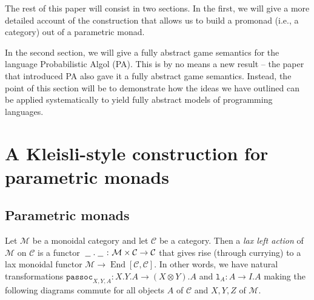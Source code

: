 \documentclass{svproc}
\newcommand\C{\mathcal{C}}
\newcommand\M{\mathcal{M}}
\DeclareMathOperator{\End}{End}
\newcommand{\passoc}{\texttt{passoc}}
\newcommand{\assoc}{\texttt{assoc}}
\newcommand\tensor\otimes
\newcommand\lun{\texttt{l}}
\newcommand\lunit{\texttt{lunit}}
\newcommand\runit{\texttt{runit}}
\newcommand*\from{\colon}
\newcommand{\0}{{\mathtt{0}}} \newcommand{\com}{{\mathtt{com}}}
\newcommand{\blank}{\;\underline{\hspace{1.5ex}}\;}
\begin{document}
The rest of this paper will consist in two sections.  
In the first, we will give a more detailed account of the construction that allows us to build a promonad (i.e., a category) out of a parametric monad.  

In the second section, we will give a fully abstract game semantics for the language Probabilistic Algol (PA).  
This is by no means a new result -- the paper \cite{DanosHarmer} that introduced PA also gave it a fully abstract game semantics.  
Instead, the point of this section will be to demonstrate how the ideas we have outlined can be applied systematically to yield fully abstract models of programming languages.

\section{A Kleisli-style construction for parametric monads}

\subsection{Parametric monads}

Let $\M$ be a monoidal category and let $\C$ be a category.  
Then a \emph{lax left action} of $\M$ on $\C$ is a functor $\blank.\blank\from \M\times\C\to \C$ that gives rise (through currying) to a lax monoidal functor $\M\to \End[\C,\C]$.  
In other words, we have natural transformations $\passoc_{X,Y,A}\from X.Y.A\to (X\tensor Y).A$ and $\lun_A\from A \to I.A$ making the following diagrams commute for all objects $A$ of $\C$ and $X,Y,Z$ of $\M$.

\end{document}
